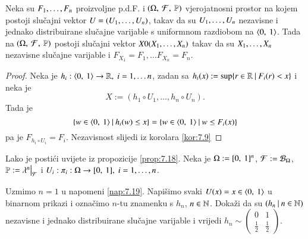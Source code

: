 \begin{prop}    \label{prop:7.18}
    Neka su ${F}_1, \ldots, {F}_n$ proizvoljne p.d.F. i $(\Omega, \: \mathcal{F}, \: \mathbb{P})$ vjerojatnosni prostor na kojem postoji slu\v cajni vektor $U = ({U}_1, \ldots, {U}_n)$, takav da su ${U}_1, \ldots, {U}_n $ nezavisne i jednako distribuirane slu\v cajne varijable s uniformnom razdiobom na $\langle {0}, \: {1} \rangle$.
    Tada na $(\Omega, \: \mathcal{F}, \: \mathbb{P})$ postoji slu\v cajni vektor $X 0 ({X}_1, \ldots, {X}_n)$ takav da su ${X}_1, \ldots, {X}_n$ nezavisne slu\v cajne varijable i $F_{X_1} = F_1, \ldots F_{X_n} = F_n$.
\end{prop}

\begin{proof}
    Neka je $h_i : \langle {0}, \: {1} \rangle \to \mathbb{R}, \; i = 1, \ldots n$, zadan sa $h_i (x) := \sup \{{r \in \mathbb{R}} \: | \: {F_i (r) < x}\}$ i neka je
    \begin{equation*}
        X := (h_1 \circ U_1, \ldots, h_n \circ U_n).
    \end{equation*} 
    Tada je
    \begin{equation*}
        \{{w \in \langle {0}, \: {1} \rangle} \: | \: {h_i(w) \leq x}\} = \{{w \in \langle {0}, \: {1} \rangle} \: | \: {w \leq F_i (x)}\}
    \end{equation*}
    pa je $F_{h_i \circ U_i} = F_i$.
    Nezavisnost slijedi iz korolara \ref{kor:7.9}
\end{proof}

\begin{nap} \label{nap:7.19}
    Lako je posti\' ci uvijete iz propozicije \ref{prop:7.18}.
    Neka je $\Omega := [{0}, \:{1}]^n$, $\mathcal{F} := \mathcal{B}_{\Omega}$, $\masP := \restr{\lambda^n}{\famF}$ i $U_i : \pi_i : \Omega \to [{0}, \:{1}], \; i = 1, \ldots, n$.
\end{nap}

\begin{zad} \label{zad:7.20}
    Uzmimo $n = 1$ u napomeni \ref{nap:7.19}. Napi\v simo svaki $U(x) = x \in \langle {0}, \: {1} \rangle$ u binarnom prikazi i ozna\v cimo $n$-tu znamenku s $h_n$, $n \in \mathbb{N}$.
    Doka\v zi da su $({h_n} \: | \: {n \in \mathbb{N}})$ nezavisne i jednako distribuirane slu\v cajne varijable i vrijedi
    $h_n \sim
    \begin{pmatrix}
        0& 1\\
        \frac{1}{2}& \frac{1}{2}    
    \end{pmatrix}$.
\end{zad}